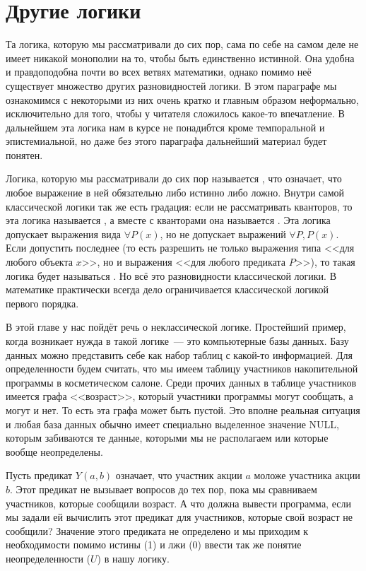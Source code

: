 \section{Другие логики}

Та логика, которую мы рассматривали до сих пор, сама по себе на самом деле не имеет никакой монополии на то, чтобы быть единственно истинной. Она удобна и правдоподобна почти во всех ветвях математики, однако помимо неё существует множество других разновидностей логики. В этом параграфе мы ознакомимся с некоторыми из них очень кратко и главным образом неформально, исключительно для того, чтобы у читателя сложилось какое-то впечатление. В дальнейшем эта логика нам в курсе не понадибтся кроме темпоральной и эпистемиальной, но даже без этого параграфа дальнейший материал будет понятен.

Логика, которую мы рассматривали до сих пор называется , что означает, что любое выражение в ней обязательно либо истинно либо ложно. Внутри самой классической логики так же есть градация: если не рассматривать кванторов, то эта логика называется , а вместе с кванторами она называется . Эта логика допускает выражения вида $\forall P(x)$, но не допускает выражений $\forall P, P(x)$. Если допустить последнее (то есть разрешить не только выражения типа <<для любого объекта $x$>>, но и выражения <<для любого предиката $P$>>), то такая логика будет называться . Но всё это разновидности классической логики. В математике практически всегда дело ограничивается классической логикой первого порядка.

В этой главе у нас пойдёт речь о неклассической логике. Простейший пример, когда возникает нужда в такой логике~--- это компьютерные базы данных. Базу данных можно представить себе как набор таблиц с какой-то информацией. Для определенности будем считать, что мы имеем таблицу участников накопительной программы в косметическом салоне. Среди прочих данных в таблице участников имеется графа <<возраст>>, который участники программы могут сообщать, а могут и нет. То есть эта графа может быть пустой. Это вполне реальная ситуация и любая база данных обычно имеет специально выделенное значение NULL, которым забиваются те данные, которыми мы не располагаем или которые вообще неопределены.

Пусть предикат $Y(a, b)$ означает, что участник акции $a$ моложе участника акции $b$. Этот предикат не вызывает вопросов до тех пор, пока мы сравниваем участников, которые сообщили возраст. А что должна вывести программа, если мы задали ей вычислить этот предикат для участников, которые свой возраст не сообщили? Значение этого предиката не определено и мы приходим к необходимости помимо истины (1) и лжи (0) ввести так же понятие неопределенности ($U$) в нашу логику.

